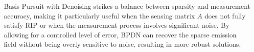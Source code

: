 Basis Pursuit with Denoising strikes a balance between sparsity and measurement accuracy, making it particularly useful when the sensing matrix $A$ does not fully satisfy RIP or when the measurement process involves significant noise.
By allowing for a controlled level of error, BPDN can recover the sparse emission field without being overly sensitive to noise, resulting in more robust solutions.








